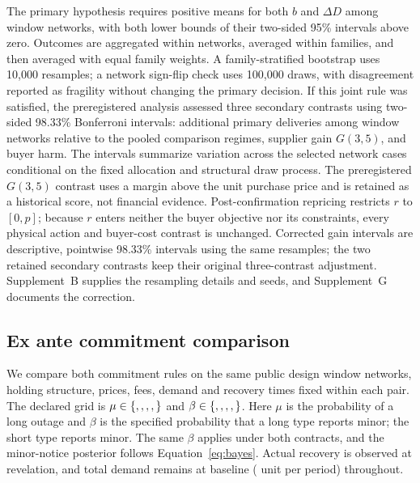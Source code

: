 \documentclass[preprint,11pt,authoryear]{elsarticle}
\begin{document}
The primary hypothesis requires positive means for both $b$ and $\Delta D$ among window networks, with both lower bounds of their two-sided 95\% intervals above zero. Outcomes are aggregated within networks, averaged within families, and then averaged with equal family weights. A family-stratified bootstrap uses 10,000 resamples; a network sign-flip check uses 100,000 draws, with disagreement reported as fragility without changing the primary decision. If this joint rule was satisfied, the preregistered analysis assessed three secondary contrasts using two-sided 98.33\% Bonferroni intervals: additional primary deliveries among window networks relative to the pooled comparison regimes, supplier gain $G(3,5)$, and buyer harm. The intervals summarize variation across the selected network cases conditional on the fixed allocation and structural draw process. The preregistered $G(3,5)$ contrast uses a margin above the unit purchase price and is retained as a historical score, not financial evidence. Post-confirmation repricing restricts $r$ to $[0,p]$; because $r$ enters neither the buyer objective nor its constraints, every physical action and buyer-cost contrast is unchanged. Corrected gain intervals are descriptive, pointwise 98.33\% intervals using the same resamples; the two retained secondary contrasts keep their original three-contrast adjustment. Supplement~B supplies the resampling details and seeds, and Supplement~G documents the correction.

\subsection{Ex ante commitment comparison}\label{sec:exante_design}
We compare both commitment rules on the same  public design window networks, holding structure, prices, fees, demand and recovery times fixed within each pair. The declared grid is $\mu\in\{\xa{mu0},\xa{mu1},\xa{mu2},\xa{mu3},\xa{mu4}\}$ and $\beta\in\{\xa{beta0},\xa{beta1},\xa{beta2},\xa{beta3},\xa{beta4}\}$. Here $\mu$ is the probability of a long outage and $\beta$ is the specified probability that a long type reports minor; the short type reports minor. The same $\beta$ applies under both contracts, and the minor-notice posterior follows Equation~\eqref{eq:bayes}. Actual recovery is observed at revelation, and total demand remains at baseline ( unit per period) throughout.
\end{document}
